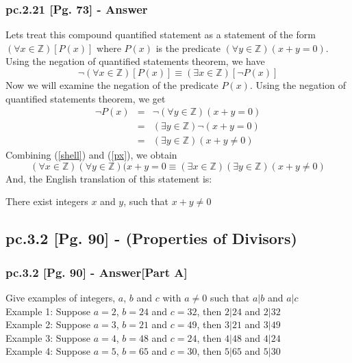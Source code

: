 \subsubsection*{pc.2.21 [Pg. 73] - Answer}
Lets treat this compound quantified statement as a statement of the form $(\forall x \in \mathbb{Z})[P(x)]$ where $P(x)$ is the predicate $(\forall y \in \mathbb{Z})(x + y = 0)$. Using the negation of quantified statements theorem, we have   
	\begin{equation}
		\label{shell}
		\neg (\forall x \in \mathbb{Z})[P(x)] \equiv (\exists x \in \mathbb{Z})[\neg P(x)]
	\end{equation}
Now we will examine the negation of the predicate $P(x)$. Using the negation of quantified statements theorem, we get
	\begin{eqnarray}
		\neg P(x) & = & \neg (\forall y \in \mathbb{Z})(x + y = 0) \nonumber \\
		& = & (\exists y \in \mathbb{Z})\neg (x + y = 0) \nonumber \\
		& = & (\exists y \in \mathbb{Z})(x + y \neq 0) \label{px}
	\end{eqnarray}
Combining (\ref{shell}) and (\ref{px}), we obtain \[ (\forall x \in \mathbb{Z})(\forall y \in \mathbb{Z})(x + y = 0 \equiv (\exists x \in \mathbb{Z})(\exists y \in \mathbb{Z})(x + y \neq 0)  \] And, the English translation of this statement is:
	\begin{center}
		There exist integers $x$ and $y$, such that $x + y \neq 0$	
	\end{center}


\newpage
\subsection{pc.3.2 [Pg. 90] - (Properties of Divisors)}


\subsubsection*{pc.3.2 [Pg. 90] - Answer[Part A]}

Give examples of integers, $a$, $b$ and $c$ with $a \neq 0$ such that $a | b$ and $a | c$ \\ 
Example 1: Suppose $a = 2$, $b = 24$ and $c = 32$, then $2 | 24$ and $2 | 32$\\
Example 2: Suppose $a = 3$, $b = 21$ and $c = 49$, then $3 | 21$ and $3 | 49$\\
Example 3: Suppose $a = 4$, $b = 48$ and $c = 24$, then $4 | 48$ and $4 | 24$\\
Example 4: Suppose $a = 5$, $b = 65$ and $c = 30$, then $5 | 65$ and $5 | 30$\\

